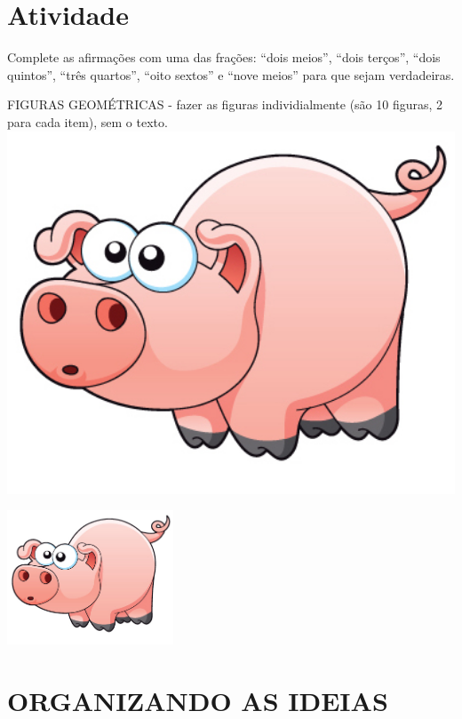 \documentclass[a4,12pt]{book}
\begin{document}
\section{Atividade}







Complete as afirmações com uma das frações: ``dois meios'', ``dois terços'', ``dois quintos'', ``três quartos'', ``oito sextos'' e ``nove meios'' para que sejam verdadeiras.

\begin{imagem*}[breakable]{}{}   FIGURAS GEOMÉTRICAS -  fazer as figuras individialmente (são 10 figuras, 2 para cada item), sem o texto.
    \includegraphics[width=420pt, keepaspectratio]{pig}
\end{imagem*}






\includegraphics[width=\textwidth,height=4cm, keepaspectratio]{pig}


\section*{ ORGANIZANDO AS IDEIAS }
\end{document}
